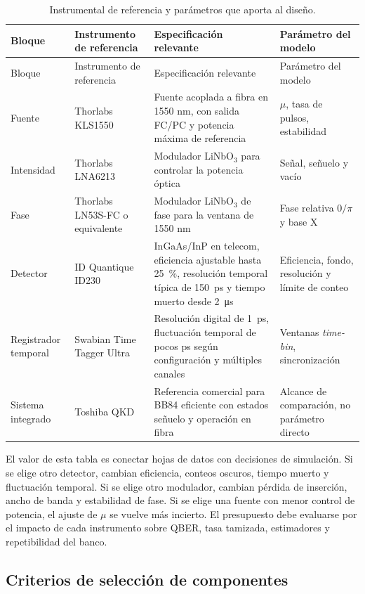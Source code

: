 \begin{longtable}{@{}p{}p{}p{}p{}@{}}
  \caption{Instrumental de referencia y parámetros que aporta al diseño.}
  \label{tab:instrumental_datasheets}\\
  \toprule
  Bloque & Instrumento de referencia & Especificación relevante & Parámetro del modelo \\
  \midrule
  \endfirsthead
  \toprule
  Bloque & Instrumento de referencia & Especificación relevante & Parámetro del modelo \\
  \midrule
  \endhead
  Fuente & Thorlabs KLS1550 & Fuente acoplada a fibra en 1550 nm, con salida FC/PC y potencia máxima de referencia & \(\mu\), tasa de pulsos, estabilidad \\
  Intensidad & Thorlabs LNA6213 & Modulador LiNbO\(_3\) para controlar la potencia óptica & Señal, señuelo y vacío \\
  Fase & Thorlabs LN53S-FC o equivalente & Modulador LiNbO\(_3\) de fase para la ventana de 1550 nm & Fase relativa \(0/\pi\) y base X \\
  Detector & ID Quantique ID230 & InGaAs/InP en telecom, eficiencia ajustable hasta \SI{25}{\percent}, resolución temporal típica de \SI{150}{\pico\second} y tiempo muerto desde \SI{2}{\micro\second} & Eficiencia, fondo, resolución y límite de conteo \\
  Registrador temporal & Swabian Time Tagger Ultra & Resolución digital de \SI{1}{\pico\second}, fluctuación temporal de pocos ps según configuración y múltiples canales & Ventanas \textit{time-bin}, sincronización \\
  Sistema integrado & Toshiba QKD & Referencia comercial para BB84 eficiente con estados señuelo y operación en fibra & Alcance de comparación, no parámetro directo \\
  \bottomrule
\end{longtable}

El valor de esta tabla es conectar hojas de datos con decisiones de simulación. Si se elige otro detector, cambian eficiencia, conteos oscuros, tiempo muerto y fluctuación temporal. Si se elige otro modulador, cambian pérdida de inserción, ancho de banda y estabilidad de fase. Si se elige una fuente con menor control de potencia, el ajuste de \(\mu\) se vuelve más incierto. El presupuesto debe evaluarse por el impacto de cada instrumento sobre QBER, tasa tamizada, estimadores y repetibilidad del banco.

\subsection{Criterios de selección de componentes}

